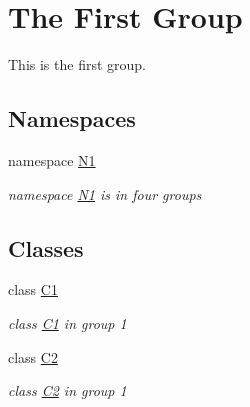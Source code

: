 \hypertarget{group__group1}{\section{The First Group}
\label{group__group1}
}


This is the first group.  


\subsection*{Namespaces}
\begin{DoxyCompactItemize}
\item 
namespace \hyperlink{namespace_n1}{N1}
\begin{DoxyCompactList}\small\item\em namespace \hyperlink{namespace_n1}{N1} is in four groups \end{DoxyCompactList}\end{DoxyCompactItemize}
\subsection*{Classes}
\begin{DoxyCompactItemize}
\item 
class \hyperlink{class_c1}{C1}
\begin{DoxyCompactList}\small\item\em class \hyperlink{class_c1}{C1} in group 1 \end{DoxyCompactList}\item 
class \hyperlink{class_c2}{C2}
\begin{DoxyCompactList}\small\item\em class \hyperlink{class_c2}{C2} in group 1 \end{DoxyCompactList}\end{DoxyCompactItemize}
